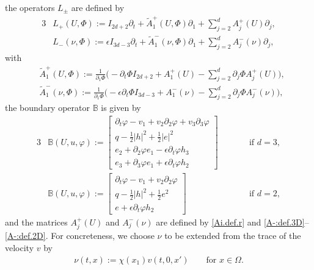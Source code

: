 \documentclass[twoside,11pt]{article}
\numberwithin{equation}{section}
\def\p{\partial}
\begin{document}
the operators $L_{\pm}$ are defined by
	\begin{alignat}{3}	\label{L+:def}
		&L_+(U,\Phi):=I_{2d+2}\partial_t+\widetilde{A}_1^+(U,\Phi)\partial_1+ \sum_{j=2}^{d}A_j^+(U)\partial_j,\\
		&L_-(\nu,\Phi):=\epsilon I_{3d-3} \partial_t+\widetilde{A}_1^-(\nu,\Phi)\partial_1+\sum_{j=2}^{d} A_j^-(\nu)\partial_j ,
		\label{L-:def}
	\end{alignat}
	with
	\begin{align}
		\nonumber %
		&\widetilde{A}_1^+(U,\Phi):=
		\frac{1}{\partial_1\Phi}\Big(\!-\partial_t\Phi I_{2d+2}+A_1^+(U)-\sum_{j=2}^{d}\partial_j\Phi A_j^+(U)\Big),\\[1mm]
		&\widetilde{A}_1^-(\nu,\Phi):=
		\frac{1}{\partial_1\Phi}\Big(\!-\epsilon\partial_t\Phi I_{3d-3}+A_1^-(\nu)-\sum_{j=2}^{d}\partial_j\Phi A_j^-(\nu)\Big),
		\nonumber %
	\end{align}
the boundary operator $\mathbb{B}$ is given by
	\begin{alignat}{3} \label{Bbb3D:def}
 &\mathbb{B}(U,u,\varphi):=
 \begin{bmatrix}
	\p_t \varphi -v_1+v_2\p_2\varphi+v_3\p_3\varphi\\[0.5mm]
	q-\tfrac{1}{2}|h|^2+\frac{1}{2}|e|^2\\[0.5mm]
	e_2+\p_2 \varphi e_1-\epsilon \p_t \varphi h_3\\[0.5mm]
	e_3+\p_3 \varphi e_1+\epsilon \p_t \varphi h_2
\end{bmatrix}\qquad &&\textrm{if }d=3,\\[1mm]
 &\mathbb{B}(U,u,\varphi):= \begin{bmatrix}
	\p_t \varphi -v_1+v_2\p_2\varphi \\[0.5mm]	 	
	q-\tfrac{1}{2}|h|^2+\frac{1}{2}e^2\\[0.5mm]
	e+\epsilon \p_t \varphi h_2
\end{bmatrix}\qquad &&\textrm{if }d=2,
\label{Bbb2D:def}	
	\end{alignat}
and the matrices $A_j^+(U)$ and $A_j^-(\nu)$ are defined by \eqref{Ai.def.r} and \eqref{A-:def.3D}--\eqref{A-:def.2D}.
For concreteness, we choose $\nu$ to be extended from the trace of the velocity $v$ by
\begin{align} \label{nu:def1}
	\nu(t,x):=\chi(x_1)v(t,0, x')\qquad \textrm{for } x\in\Omega.
\end{align}
\end{document}
